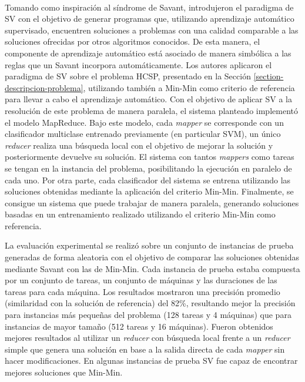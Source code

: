 \paragraph{}Tomando como inspiración al síndrome de Savant, \citet{savant-original} introdujeron el paradigma de SV con el objetivo de generar programas que, utilizando aprendizaje automático supervisado, encuentren soluciones a problemas con una calidad comparable a las soluciones ofrecidas por otros algoritmos conocidos. De esta manera, el componente de aprendizaje automático está asociado de manera simbólica a las reglas que un Savant incorpora automáticamente.
Los autores aplicaron el paradigma de SV sobre el problema HCSP, presentado en la Sección \ref{section-descripcion-problema}, utilizando también a Min-Min como criterio de referencia para llevar a cabo el aprendizaje automático.
Con el objetivo de aplicar SV a la resolución de este problema de manera paralela, el sistema planteado implementó el modelo MapReduce. Bajo este modelo, cada \textit{mapper} se corresponde con un clasificador multiclase entrenado previamente (en particular SVM), un único \textit{reducer} realiza una búsqueda local con el objetivo de mejorar la solución y posteriormente devuelve su solución. El sistema con tantos \textit{mappers} como tareas se tengan en la instancia del problema, posibilitando la ejecución en paralelo de cada uno. Por otra parte, cada clasificador del sistema se entrena utilizando las soluciones obtenidas mediante la aplicación del criterio Min-Min. Finalmente, se consigue un sistema que puede trabajar de manera paralela, generando soluciones basadas en un entrenamiento realizado utilizando el criterio Min-Min como referencia. 

La evaluación experimental se realizó sobre un conjunto de instancias de prueba generadas de forma aleatoria con el objetivo de comparar las soluciones obtenidas mediante Savant con las de Min-Min. Cada instancia de prueba estaba compuesta por un conjunto de tareas, un conjunto de máquinas y las duraciones de las tareas para cada máquina. 
Los resultados mostraron una precisión promedio (similaridad con la solución de referencia) del 82\%, resultando mejor la precisión para instancias más pequeñas del problema (128 tareas y 4 máquinas) que para instancias de mayor tamaño (512 tareas y 16 máquinas). 
Fueron obtenidos mejores resultados al utilizar un \textit{reducer} con búsqueda local frente a un \textit{reducer} simple que genera una solución en base a la salida directa de cada \textit{mapper} sin hacer modificaciones. En algunas instancias de prueba SV fue capaz de encontrar mejores soluciones que Min-Min. 

